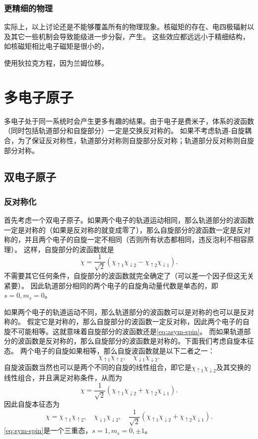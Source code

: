 \subsection{更精细的物理}


实际上，以上讨论还是不能够覆盖所有的物理现象。核磁矩的存在、电四极辐射以及其它一些机制会导致能级进一步分裂，产生。
这些效应都远远小于精细结构，如核磁矩相比电子磁矩是很小的，

使用狄拉克方程，因为兰姆位移。

\chapter{多电子原子}

多电子处于同一系统时会产生更多有趣的结果。由于电子是费米子，体系的波函数（同时包括轨道部分和自旋部分）一定是交换反对称的。
如果不考虑轨道-自旋耦合，为了保证反对称性，轨道部分对称则自旋部分反对称；轨道部分反对称则自旋部分对称。

\section{双电子原子}

\subsection{反对称化}

首先考虑一个双电子原子。如果两个电子的轨道运动相同，那么轨道部分的波函数一定是对称的（如果是反对称的就变成零了），那么自旋部分的波函数一定是反对称的，并且两个电子的自旋一定不相同（否则所有状态都相同，违反泡利不相容原理）。
这样，自旋部分的波函数就是
\begin{equation}
    \chi = \frac{1}{\sqrt{2}} (\chi_{\uparrow 1} \chi_{\downarrow 2} - \chi_{\uparrow 2} \chi_{\downarrow 1}).
    \label{eq:asym-spin}
\end{equation}
不需要其它任何条件，自旋部分的波函数就完全确定了（可以差一个因子但这无关紧要）。
因此轨道部分相同的两个电子的自旋角动量代数是单态的，即$s=0, m_s=0$。

如果两个电子的轨道运动不同，那么轨道部分的波函数可以是对称的也可以是反对称的。
假定它是对称的，那么自旋部分的波函数一定反对称，因此两个电子的自旋不可能相等。这就意味着自旋部分的波函数还是\eqref{eq:asym-spin}。
而如果轨道部分的波函数是反对称的，那么自旋部分的波函数是对称的。下面我们考虑自旋本征态。
两个电子的自旋如果相等，那么自旋波函数就是以下二者之一：
\[
    \chi_{\uparrow 1} \chi_{\uparrow 2}, \quad \chi_{\downarrow 1} \chi_{\downarrow 2}.
\]
自旋波函数当然也可以是两个不同的自旋的线性组合，即它是$\chi_{\uparrow 1} \chi_{\downarrow 2}$及其交换的线性组合，并且满足对称条件，从而为
\[
    \chi = \frac{1}{\sqrt{2}} (\chi_{\uparrow 1} \chi_{\downarrow 2} + \chi_{\uparrow 2} \chi_{\downarrow 1}).
\]
因此自旋本征态为
\begin{equation}
    \chi = \chi_{\uparrow 1} \chi_{\uparrow 2}, \quad \chi_{\downarrow 1} \chi_{\downarrow 2}, \quad \frac{1}{\sqrt{2}} (\chi_{\uparrow 1} \chi_{\downarrow 2} + \chi_{\uparrow 2} \chi_{\downarrow 1}).
    \label{eq:sym-spin}
\end{equation}
\eqref{eq:sym-spin}是一个三重态，$s=1, m_s=0, \pm 1$。

